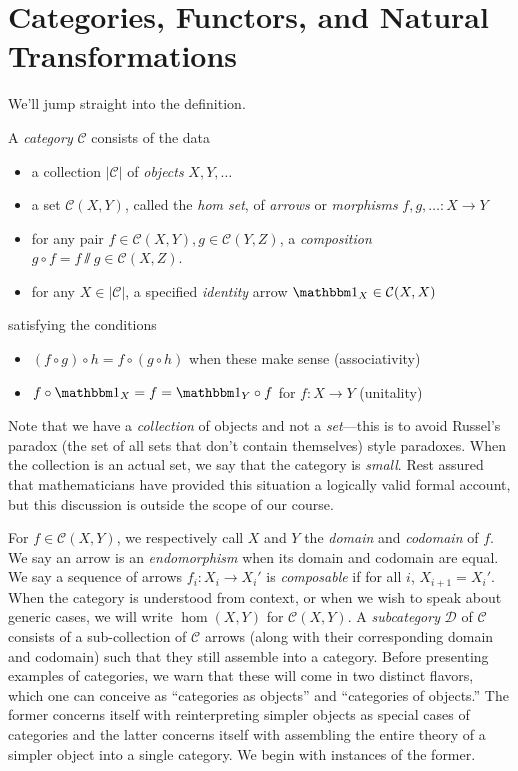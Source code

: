 \section{Categories, Functors, and Natural Transformations}

We'll jump straight into the definition.

\begin{dfn}
A \emph{category} $\mathcal{C}$ consists of the data
\begin{itemize}
\item a collection $|\mathcal{C}|$ of \emph{objects} $X,Y,\dots$
\item a set $\mathcal{C}(X,Y)$, called the \emph{hom set}, of \emph{arrows} or \emph{morphisms} $f,g,\dots : X\to Y$
\item for any pair $f\in\mathcal{C}(X, Y),g\in\mathcal{C}(Y,Z)$, a \emph{composition}  $g\circ f = f\sslash g\in\mathcal{C}(X,Z)$.  
\item for any $X\in|\mathcal{C}|$, a specified \emph{identity} arrow $\Id{X}\in\mathcal{C}(X,X)$
\end{itemize}
satisfying the conditions
\begin{itemize}
\item $(f\circ g)\circ h = f\circ (g\circ h)$ when these make sense (associativity)
\item $f\circ \Id{X} = f = \Id{Y}\circ f$ for $f:X\to Y$ (unitality)
\end{itemize}
\end{dfn}

\begin{rem} Note that we have a \emph{collection} of objects and not a \emph{set}---this is to avoid Russel's paradox (the set of all sets that don't contain themselves) style paradoxes. When the collection is an actual set, we say that the category is \emph{small}. Rest assured that mathematicians have provided this situation a logically valid formal account, but this discussion is outside the scope of our course.
\end{rem}

For $f\in\mathcal{C}(X,Y)$, we respectively call $X$ and $Y$ the \emph{domain} and \emph{codomain} of $f$. We say an arrow is an \emph{endomorphism} when its domain and codomain are equal. We say a sequence of arrows $f_i:X_i\to X_i'$ is \emph{composable} if for all $i$, $X_{i+1}=X_i'$. When the category is understood from context, or when we wish to speak about generic cases, we will write $\hom(X,Y)$ for $\mathcal{C}(X,Y)$. A \emph{subcategory} $\mathcal{D}$ of $\mathcal{C}$ consists of a sub-collection of $\mathcal{C}$ arrows (along with their corresponding domain and codomain) such that they still assemble into a category. Before presenting examples of categories, we warn that these will come in two distinct flavors, which one can conceive as ``categories as objects'' and ``categories of objects.'' The former concerns itself with reinterpreting simpler objects as special cases of categories and the latter concerns itself with assembling the entire theory of a simpler object into a single category. We begin with instances of the former.

